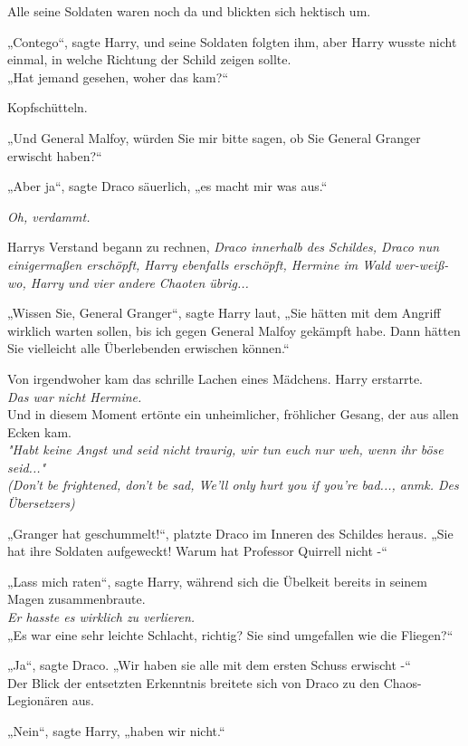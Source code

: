 {Alle seine Soldaten waren noch da und blickten sich hektisch um.

„Contego“, sagte Harry, und seine Soldaten folgten ihm, aber Harry wusste nicht einmal, in welche Richtung der Schild zeigen sollte.\\ „Hat jemand gesehen, woher das kam?“

Kopfschütteln.

„Und General Malfoy, würden Sie mir bitte sagen, ob Sie General Granger erwischt haben?“

„Aber ja“, sagte Draco säuerlich, „es macht mir was aus.“

\emph{Oh, verdammt.}

Harrys Verstand begann zu rechnen, \emph{Draco innerhalb des Schildes, Draco nun} \emph{einigermaßen erschöpft, Harry ebenfalls erschöpft, Hermine im Wald wer-weiß-wo, Harry und vier andere Chaoten übrig...}

„Wissen Sie, General Granger“, sagte Harry laut, „Sie hätten mit dem Angriff wirklich warten sollen, bis ich gegen General Malfoy gekämpft habe. Dann hätten Sie vielleicht alle Überlebenden erwischen können.“

Von irgendwoher kam das schrille Lachen eines Mädchens. Harry erstarrte.\\ \emph{Das war nicht Hermine.}\\ Und in diesem Moment ertönte ein unheimlicher, fröhlicher Gesang, der aus allen Ecken kam.\\ \emph{"Habt keine Angst und seid nicht traurig, wir tun euch nur weh, wenn ihr böse seid..."}\\ \emph{(Don't be frightened, don't be sad, We'll only hurt you if you're bad..., anmk. Des Übersetzers)}

„Granger hat geschummelt!“, platzte Draco im Inneren des Schildes heraus. „Sie hat ihre Soldaten aufgeweckt! Warum hat Professor Quirrell nicht -“

„Lass mich raten“, sagte Harry, während sich die Übelkeit bereits in seinem Magen zusammenbraute.\\ \emph{Er hasste es wirklich zu verlieren.}\\ „Es war eine sehr leichte Schlacht, richtig? Sie sind umgefallen wie die Fliegen?“

„Ja“, sagte Draco. „Wir haben sie alle mit dem ersten Schuss erwischt -“\\ Der Blick der entsetzten Erkenntnis breitete sich von Draco zu den Chaos-Legionären aus.

„Nein“, sagte Harry, „haben wir nicht.“

}
